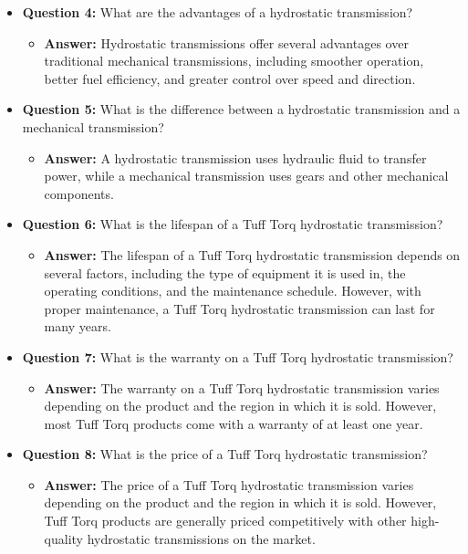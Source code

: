 \documentclass{article}
\begin{document}
\begin{itemize}
    \item \textbf{Question 4:} What are the advantages of a hydrostatic transmission?
    \begin{itemize}
        \item \textbf{Answer:} Hydrostatic transmissions offer several advantages over traditional mechanical transmissions, including smoother operation, better fuel efficiency, and greater control over speed and direction.
    \end{itemize}
    
    \item \textbf{Question 5:} What is the difference between a hydrostatic transmission and a mechanical transmission?
    \begin{itemize}
        \item \textbf{Answer:} A hydrostatic transmission uses hydraulic fluid to transfer power, while a mechanical transmission uses gears and other mechanical components.
    \end{itemize}
    
    \item \textbf{Question 6:} What is the lifespan of a Tuff Torq hydrostatic transmission?
    \begin{itemize}
        \item \textbf{Answer:} The lifespan of a Tuff Torq hydrostatic transmission depends on several factors, including the type of equipment it is used in, the operating conditions, and the maintenance schedule. However, with proper maintenance, a Tuff Torq hydrostatic transmission can last for many years.
    \end{itemize}
    
    \item \textbf{Question 7:} What is the warranty on a Tuff Torq hydrostatic transmission?
    \begin{itemize}
        \item \textbf{Answer:} The warranty on a Tuff Torq hydrostatic transmission varies depending on the product and the region in which it is sold. However, most Tuff Torq products come with a warranty of at least one year.
    \end{itemize}
    
    \item \textbf{Question 8:} What is the price of a Tuff Torq hydrostatic transmission?
    \begin{itemize}
        \item \textbf{Answer:} The price of a Tuff Torq hydrostatic transmission varies depending on the product and the region in which it is sold. However, Tuff Torq products are generally priced competitively with other high-quality hydrostatic transmissions on the market.
    \end{itemize}
    

\end{itemize}
\end{document}
